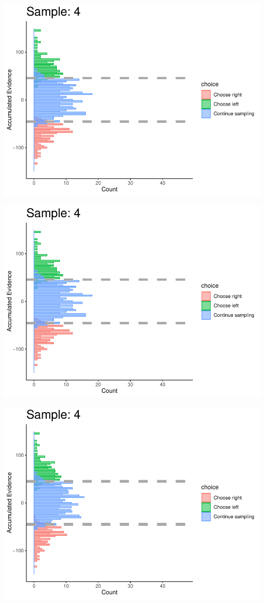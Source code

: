 \documentclass[
]{book}
\begin{document}
\begin{center}\includegraphics[width=0.8\linewidth]{LateNightBayes_files/figure-latex/collapsing_check-35} \end{center}

\begin{center}\includegraphics[width=0.8\linewidth]{LateNightBayes_files/figure-latex/collapsing_check-36} \end{center}

\begin{center}\includegraphics[width=0.8\linewidth]{LateNightBayes_files/figure-latex/collapsing_check-37} \end{center}
\end{document}
